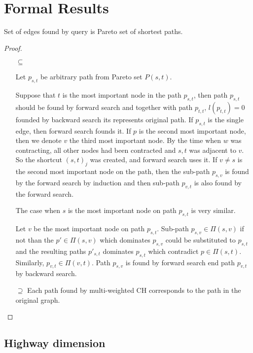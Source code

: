 

\section{Formal Results}
\begin{lemma}
Set of edges found by query is Pareto set of shortest paths.
\end{lemma}
\begin{proof}
\begin{itemize}
\item[$\subseteq$] 

Let $p_{s,t}$ be arbitrary path from Pareto set $P(s,t)$. 

Suppose that $t$ is the most important node in the path $p_{s,t}$, 
then path $p_{s,t}$ should be found by forward search
and together with path $p_{t,t}$, $l(p_{t,t})=0$ 
founded by backward search its represents original path.
If $p_{s,t}$ is the single edge, then forward search founds it.
If $p$ is the second most important node, then we denote $v$ the
third most important node. 
By the time when $w$ was contracting, all other nodes had been contracted
and $s,t$ was adjacent to $v$. So the shortcut $(s,t)_j$ was created, and forward search uses it.
If $v \ne s$ is the second most important node on the path,
then the sub-path $p_{s,v}$ is found by the forward search by induction and
then sub-path $p_{v,t}$ is also found by the forward search.

The case when $s$ is the most important node on path $p_{s,t}$ is very similar. 

Let $v$ be the most important node on path $p_{s,t}$. 
Sub-path $p_{s,v} \in \Pi(s,v)$ 
if not than the $p' \in \Pi(s,v)$ which dominates $p_{s,v}$ could be substituted
to $p_{s,t}$ and the resulting paths $p'_{s,t}$ dominates $p_{s,t}$ which contradict
$p \in \Pi(s,t)$.
Similarly, $p_{v,t} \in \Pi(v,t) $. Path $p_{s,v}$ is found by forward search end path
$p_{v,t}$ by backward search.

\item[$\supseteq$] 
Each path found by multi-weighted CH corresponds to the path in the original graph. 

\end{itemize}
\end{proof}

\subsection{Highway dimension}

